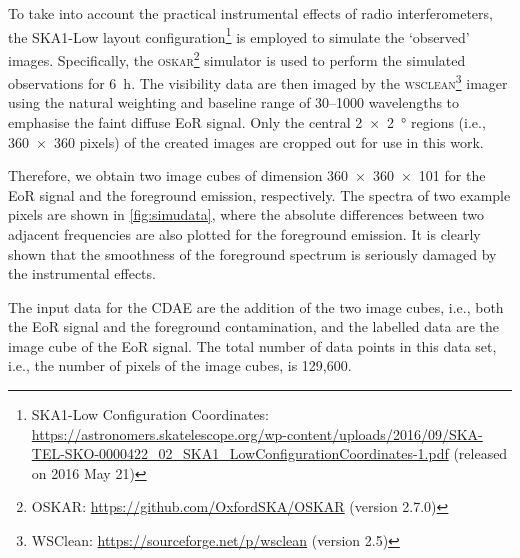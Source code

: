 \documentclass[letters,a4paper,fleqn,usenatbib]{mnras}
\begin{document}
To take into account the practical instrumental effects of radio
interferometers, the SKA1-Low layout configuration\footnote{%
  SKA1-Low Configuration Coordinates:
  \url{https://astronomers.skatelescope.org/wp-content/uploads/2016/09/SKA-TEL-SKO-0000422_02_SKA1_LowConfigurationCoordinates-1.pdf}
  (released on 2016 May 21)}
is employed to simulate the `observed' images.
Specifically, the \textsc{oskar}\footnote{%
  OSKAR: \url{https://github.com/OxfordSKA/OSKAR} (version 2.7.0)}
simulator \citep{mort2010} is used to perform the simulated
observations for \SI{6}{\hour}.
The visibility data are then imaged by the \textsc{wsclean}\footnote{%
  WSClean: \url{https://sourceforge.net/p/wsclean} (version 2.5)}
imager \citep{offringa2014} using the natural weighting and baseline
range of \numrange{30}{1000} wavelengths to emphasise the faint diffuse
EoR signal.
Only the central \SI{2 x 2}{\degree} regions (i.e., \num{360 x 360}
pixels) of the created images are cropped out for use in this work.

Therefore, we obtain two image cubes of dimension \num{360 x 360 x 101}
for the EoR signal and the foreground emission, respectively.
The spectra of two example pixels are shown in \autoref{fig:simudata},
where the absolute differences between two adjacent frequencies are
also plotted for the foreground emission.
It is clearly shown that the smoothness of the foreground spectrum is
seriously damaged by the instrumental effects.

The input data for the CDAE are the addition of the two image cubes,
i.e., both the EoR signal and the foreground contamination,
and the labelled data are the image cube of the EoR signal.
The total number of data points in this data set, i.e., the number of
pixels of the image cubes, is 129,600.
\end{document}
